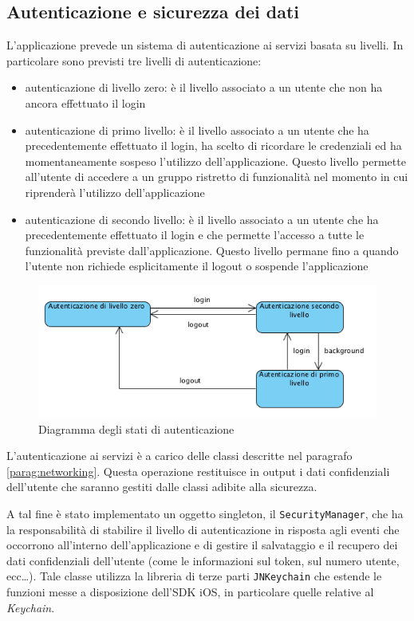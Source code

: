 \subsection{Autenticazione e sicurezza dei dati}
L'applicazione prevede un sistema di autenticazione ai servizi basata su livelli. In particolare sono previsti tre livelli di autenticazione:
\begin{itemize}
 \item autenticazione di livello zero: è il livello associato a un utente che non ha ancora effettuato il login
 \item autenticazione di primo livello: è il livello associato a un utente che ha precedentemente effettuato il login, ha scelto di ricordare le credenziali ed ha momentaneamente sospeso l'utilizzo dell'applicazione. Questo livello permette all'utente di accedere a un gruppo ristretto di funzionalità nel momento in cui riprenderà l'utilizzo dell'applicazione
 \item autenticazione di secondo livello: è il livello associato a un utente che ha precedentemente effettuato il login e che permette l'accesso a tutte le funzionalità previste dall'applicazione. Questo livello permane fino a quando l'utente non richiede esplicitamente il logout o sospende l'applicazione
\end{itemize}

\begin{figure}[!htbp]
\centering
\includegraphics[scale=0.70]{architettura/stati.png}
\caption{Diagramma degli stati di autenticazione}
\end{figure}


L'autenticazione ai servizi è a carico delle classi descritte nel paragrafo \ref{parag:networking}. Questa operazione restituisce in output i dati confidenziali dell'utente che saranno gestiti dalle classi adibite alla sicurezza.

A tal fine è stato implementato un oggetto singleton, il \texttt{SecurityManager}, che ha la responsabilità di stabilire il livello di autenticazione in risposta agli eventi che occorrono all'interno dell'applicazione e di gestire il salvataggio e il recupero dei dati confidenziali dell'utente (come le informazioni sul token, sul numero utente, ecc\dots). Tale classe utilizza la libreria di terze parti \texttt{JNKeychain} che estende le funzioni messe a disposizione dell'SDK iOS, in particolare quelle relative al \emph{Keychain}. 

